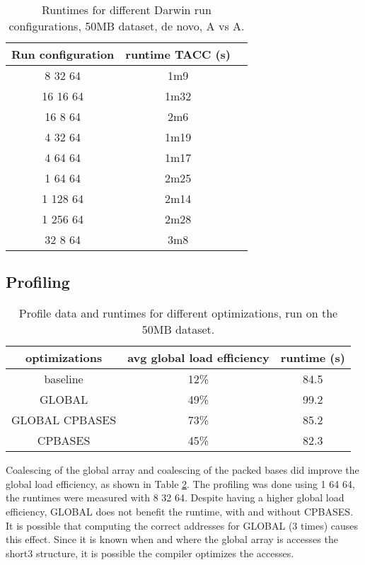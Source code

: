 \documentclass[../thesis.tex]{subfiles}
\begin{document}
\begin{table}
\centering
\caption{Runtimes for different Darwin run configurations, 50MB dataset, de novo, A vs A.}
\label{tbl:darwin6}
\begin{tabular}{c|cc}
Run configuration & runtime TACC (s) \\ \hline
 8 32 64 & 1m9 \\
16 16 64 & 1m32 \\
16  8 64 & 2m6 \\
 4 32 64 & 1m19 \\
 4 64 64 & 1m17 \\
 1 64 64 & 2m25 \\
1 128 64 & 2m14 \\
1 256 64 & 2m28 \\
 32 8 64 & 3m8 \\
\end{tabular}
\end{table}





\newpage



\subsection{Profiling}

\begin{table}
\centering
\caption{Profile data and runtimes for different optimizations, run on the 50MB dataset.}
\label{tbl:darwin_prof}
\begin{tabular}{c c c}
optimizations & avg global load efficiency & runtime (s) \\ \hline
baseline & 12\% & 84.5 \\
GLOBAL & 49\% & 99.2 \\
GLOBAL CPBASES & 73\% & 85.2 \\
CPBASES & 45\% & 82.3 \\
\end{tabular}
\end{table}

Coalescing of the global array and coalescing of the packed bases did improve the global load efficiency, as shown in Table \ref{tbl:darwin_prof}.
The profiling was done using 1 64 64, the runtimes were measured with 8 32 64.
Despite having a higher global load efficiency, GLOBAL does not benefit the runtime, with and without CPBASES.
It is possible that computing the correct addresses for GLOBAL (3 times) causes this effect.
Since it is known when and where the global array is accesses the short3 structure, it is possible the compiler optimizes the accesses.
\end{document}
